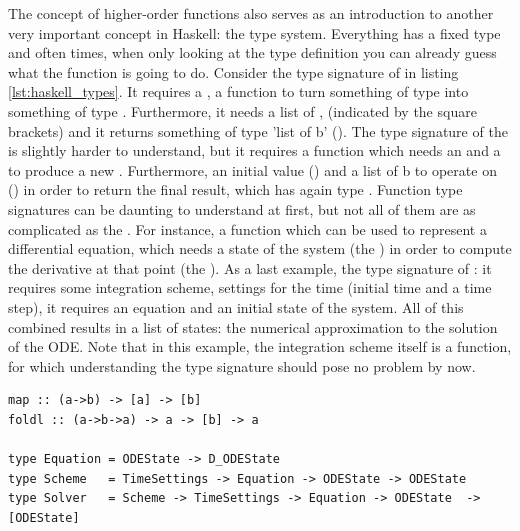 The concept of higher-order functions also serves as an introduction to another very important concept in Haskell: the type system. Everything has a fixed type and often times, when only looking at the type definition you can already guess what the function is going to do. Consider the type signature of  in listing \ref{lst:haskell_types}. It requires a , a function to turn something of type  into something of type . Furthermore, it needs a list of , \code{[a]} (indicated by the square brackets) and it returns something of type 'list of b' (\code{[b]}). The type signature of the  is slightly harder to understand, but it requires a function which needs an  and a  to produce a new . Furthermore, an initial value () and a list of b to operate on (\code{[b]}) in order to return the final result, which has again type . Function type signatures can be daunting to understand at first, but not all of them are as complicated as the . For instance, a function which can be used to represent a differential equation, which needs a state of the system (the ) in order to compute the derivative at that point (the ). As a last example, the type signature of : it requires some integration scheme, settings for the time (initial time and a time step), it requires an equation and an initial state of the system. All of this combined results in a list of states: the numerical approximation to the solution of the ODE. Note that in this example, the integration scheme  itself is a function, for which understanding the type signature should pose no problem by now.

\begin{lstlisting}[caption=Type signatures, label=lst:haskell_types]
map :: (a->b) -> [a] -> [b]
foldl :: (a->b->a) -> a -> [b] -> a

type Equation = ODEState -> D_ODEState
type Scheme   = TimeSettings -> Equation -> ODEState -> ODEState
type Solver   = Scheme -> TimeSettings -> Equation -> ODEState  -> [ODEState]
\end{lstlisting}

